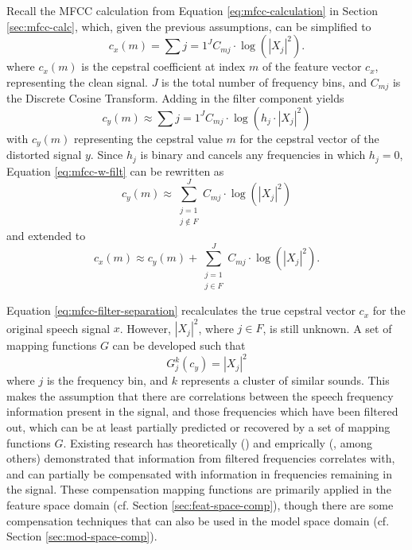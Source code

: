 Recall the MFCC calculation from Equation \ref{eq:mfcc-calculation} in Section \ref{sec:mfcc-calc}, which, given the previous assumptions, can be simplified to \begin{equation} c_x(m) = \sum{j=1}^{J} C_{mj} \cdot \log(|X_{j}|^2). \end{equation} where $c_x(m)$ is the cepstral coefficient at index $m$ of the feature vector $c_x$, representing the clean signal. $J$ is the total number of frequency bins, and $C_{mj}$ is the Discrete Cosine Transform.  Adding in the filter component yields \begin{equation}\label{eq:mfcc-w-filt} c_y(m) \approx \sum{j=1}^{J} C_{mj} \cdot \log(h_j \cdot |X_{j}|^2) \end{equation} with $c_y(m)$ representing the cepstral value $m$ for the cepstral vector of the distorted signal $y$.  Since $h_j$ is binary and cancels any frequencies in which $h_j=0$, Equation \ref{eq:mfcc-w-filt} can be rewritten as \begin{equation} c_y(m) \approx \sum_{\substack{j=1\\j\notin F}}^J C_{mj} \cdot \log(|X_j|^2) \end{equation} and extended to \begin{equation}\label{eq:mfcc-filter-separation} c_x(m) \approx c_y(m) + \sum_{\substack{j=1\\j\in F}}^J C_{mj} \cdot \log(|X_j|^2). \end{equation}
  
Equation \ref{eq:mfcc-filter-separation} recalculates the true cepstral vector $c_x$ for the original speech signal $x$.  However, $|X_j|^2$, where $j\in F$, is still unknown.  A set of mapping functions $G$ can be developed such that \begin{equation} G_j^k(c_{y}) = |X_j|^2 \end{equation} where $j$ is the frequency bin, and $k$ represents a cluster of similar sounds.  This makes the assumption that there are correlations between the speech frequency information present in the signal, and those frequencies which have been filtered out, which can be at least partially predicted or recovered by a set of mapping functions $G$. Existing research has theoretically (\cite{morales:09}) and emprically (\cite{morales:05,morales:09,he:11}, among others) demonstrated that information from filtered frequencies correlates with, and can partially be compensated with information in frequencies remaining in the signal.  These compensation mapping functions are primarily applied in the feature space domain (cf. Section \ref{sec:feat-space-comp}), though there are some compensation techniques that can also be used in the model space domain (cf. Section \ref{sec:mod-space-comp}).


